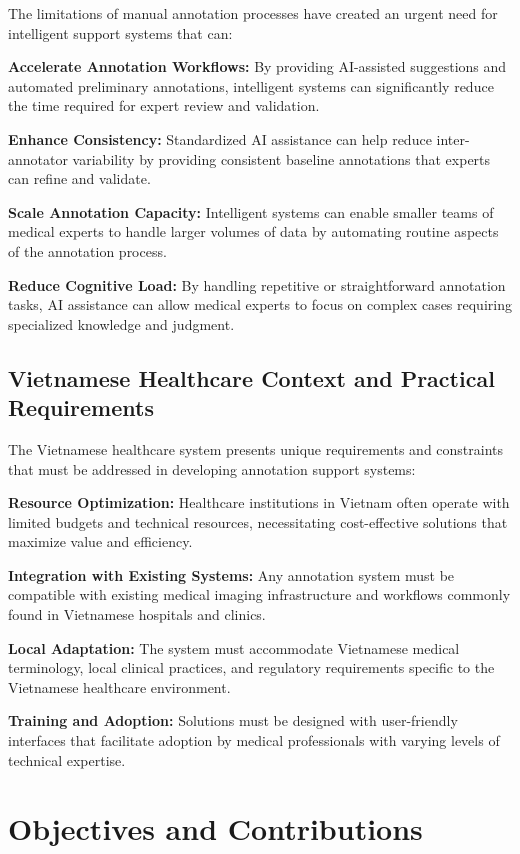 The limitations of manual annotation processes have created an urgent need for intelligent support systems that can:

\textbf{Accelerate Annotation Workflows:} By providing AI-assisted suggestions and automated preliminary annotations, intelligent systems can significantly reduce the time required for expert review and validation.

\textbf{Enhance Consistency:} Standardized AI assistance can help reduce inter-annotator variability by providing consistent baseline annotations that experts can refine and validate.

\textbf{Scale Annotation Capacity:} Intelligent systems can enable smaller teams of medical experts to handle larger volumes of data by automating routine aspects of the annotation process.

\textbf{Reduce Cognitive Load:} By handling repetitive or straightforward annotation tasks, AI assistance can allow medical experts to focus on complex cases requiring specialized knowledge and judgment.

\subsection{Vietnamese Healthcare Context and Practical Requirements}

The Vietnamese healthcare system presents unique requirements and constraints that must be addressed in developing annotation support systems:

\textbf{Resource Optimization:} Healthcare institutions in Vietnam often operate with limited budgets and technical resources, necessitating cost-effective solutions that maximize value and efficiency.

\textbf{Integration with Existing Systems:} Any annotation system must be compatible with existing medical imaging infrastructure and workflows commonly found in Vietnamese hospitals and clinics.

\textbf{Local Adaptation:} The system must accommodate Vietnamese medical terminology, local clinical practices, and regulatory requirements specific to the Vietnamese healthcare environment.

\textbf{Training and Adoption:} Solutions must be designed with user-friendly interfaces that facilitate adoption by medical professionals with varying levels of technical expertise.

\section{Objectives and Contributions}

